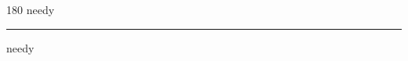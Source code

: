 
\begin{frame}
\begin{center}
\begin{turn}{180}
{\fontsize{2.5cm}{1em}\selectfont needy}
\end{turn}
\vspace{1em}\par  
\hrule
\vspace{1em}\par  
{\fontsize{2.5cm}{1em}\selectfont needy}
\end{center}
\end{frame}
